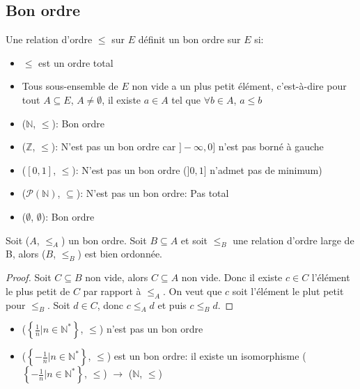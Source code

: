 \subsection{Bon ordre}

\begin{definition}
	Une relation d'ordre $\leqslant$ sur $E$ définit un bon ordre sur $E$ si:
	\begin{itemize}
		\item $\leqslant$ est un ordre total
		\item Tous sous-ensemble de $E$ non vide a un plus petit élément, c'est-à-dire pour tout $A \subseteq E$, $A \neq \emptyset$, il existe
		      $a \in A$ tel que $\forall b \in A$, $a \leqslant b$
	\end{itemize}
\end{definition}

\begin{example}
	\begin{itemize}
		\item ($\mathbb{N}$, $\leqslant$): Bon ordre
		\item ($\mathbb{Z}$, $\leqslant$): N'est pas un bon ordre car $]-\infty, 0]$ n'est pas borné à gauche
		\item ($[0, 1]$, $\leqslant$): N'est pas un bon ordre ($]0, 1]$ n'admet pas de minimum)
		\item ($\mathscr{P}(\mathbb{N})$, $\subseteq$): N'est pas un bon ordre: Pas total
		\item ($\emptyset$, $\emptyset$): Bon ordre
	\end{itemize}
\end{example}

\begin{prop}
	Soit ($A$, $\leqslant_A$) un bon ordre. Soit $B \subseteq A$ et soit $\leqslant_B$ une relation d'ordre large de B, alors ($B$, $\leqslant_B$) est bien ordonnée.
\end{prop}

\begin{proof}

	Soit $C \subseteq B$ non vide, alors $C \subseteq A$ non vide. Donc il existe $c \in C$ l'élément le plus petit de $C$ par rapport à $\leqslant_A$. On
	veut que $c$ soit l'élément le plut petit pour $\leqslant_B$. Soit $d \in C$, donc $c \leqslant_A d$ et puis $c \leqslant_B d$.

\end{proof}

\begin{example}
	\begin{itemize}
		\item ($\left\{\frac{1}{n} | n \in \mathbb{N}^*\right\}$, $\leqslant$) n'est pas un bon ordre
		\item ($\left\{-\frac{1}{n} | n \in \mathbb{N}^*\right\}$, $\leqslant$) est un bon ordre: il existe un isomorphisme ($\left\{-\frac{1}{n} | n \in \mathbb{N}^*\right\}$, $\leqslant$) $\to$ ($\mathbb{N}$, $\leqslant$)
	\end{itemize}
\end{example}

